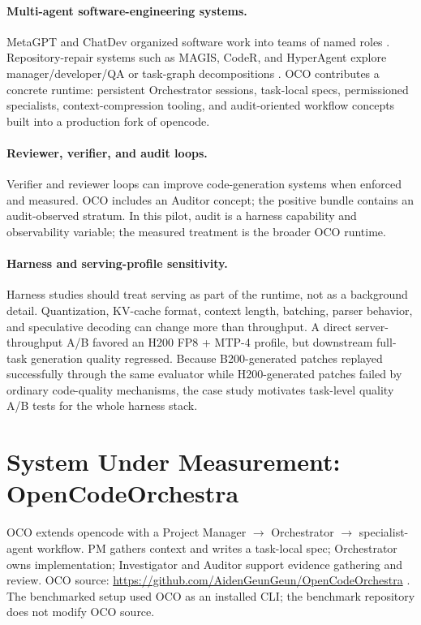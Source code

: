 \documentclass[11pt]{article}
\begin{document}
\paragraph{Multi-agent software-engineering systems.}
MetaGPT and ChatDev organized software work into teams of named roles \cite{hong2024metagpt,qian2024chatdev}. Repository-repair systems such as MAGIS, CodeR, and HyperAgent explore manager/developer/QA or task-graph decompositions \cite{tao2024magis,chen2024coder,phan2024hyperagent}. OCO contributes a concrete runtime: persistent Orchestrator sessions, task-local specs, permissioned specialists, context-compression tooling, and audit-oriented workflow concepts built into a production fork of opencode.

\paragraph{Reviewer, verifier, and audit loops.}
Verifier and reviewer loops can improve code-generation systems when enforced and measured. OCO includes an Auditor concept; the positive bundle contains an audit-observed stratum. In this pilot, audit is a harness capability and observability variable; the measured treatment is the broader OCO runtime.

\paragraph{Harness and serving-profile sensitivity.}
Harness studies should treat serving as part of the runtime, not as a background detail. Quantization, KV-cache format, context length, batching, parser behavior, and speculative decoding can change more than throughput. A direct server-throughput A/B favored an H200 FP8 + MTP-4 profile, but downstream full-task generation quality regressed. Because B200-generated patches replayed successfully through the same evaluator while H200-generated patches failed by ordinary code-quality mechanisms, the case study motivates task-level quality A/B tests for the whole harness stack.

\section{System Under Measurement: OpenCodeOrchestra}

OCO extends opencode with a Project Manager $\rightarrow$ Orchestrator $\rightarrow$ specialist-agent workflow. PM gathers context and writes a task-local spec; Orchestrator owns implementation; Investigator and Auditor support evidence gathering and review. OCO source: \url{https://github.com/AidenGeunGeun/OpenCodeOrchestra} \cite{kim2026opencodeorchestra}. The benchmarked setup used OCO as an installed CLI; the benchmark repository does not modify OCO source.
\end{document}
